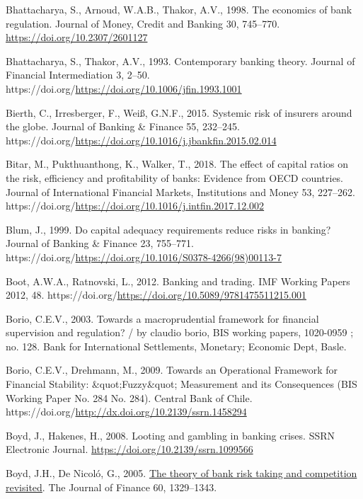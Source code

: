 \documentclass[
  12pt,
  a4paper,
  DIV=11,
  numbers=noendperiod]{scrreprt}
\newlength{\cslhangindent}
\newenvironment{CSLReferences}[2] %
 {\begin{list}{}{%
  \setlength{\itemindent}{0pt}
  \setlength{\leftmargin}{0pt}
  \setlength{\parsep}{0pt}
  \ifodd #1
   \setlength{\leftmargin}{\cslhangindent}
   \setlength{\itemindent}{-1\cslhangindent}
  \fi
  \setlength{\itemsep}{#2\baselineskip}}}
 {\end{list}}
\begin{document}
\begin{CSLReferences}{1}{0}
Bhattacharya, S., Arnoud, W.A.B., Thakor, A.V., 1998. The economics of
bank regulation. Journal of Money, Credit and Banking 30, 745--770.
\url{https://doi.org/10.2307/2601127}

Bhattacharya, S., Thakor, A.V., 1993. Contemporary banking theory.
Journal of Financial Intermediation 3, 2--50.
https://doi.org/\url{https://doi.org/10.1006/jfin.1993.1001}

Bierth, C., Irresberger, F., Weiß, G.N.F., 2015. Systemic risk of
insurers around the globe. Journal of Banking \& Finance 55, 232--245.
https://doi.org/\url{https://doi.org/10.1016/j.jbankfin.2015.02.014}

Bitar, M., Pukthuanthong, K., Walker, T., 2018. The effect of capital
ratios on the risk, efficiency and profitability of banks: Evidence from
OECD countries. Journal of International Financial Markets, Institutions
and Money 53, 227--262.
https://doi.org/\url{https://doi.org/10.1016/j.intfin.2017.12.002}

Blum, J., 1999. Do capital adequacy requirements reduce risks in
banking? Journal of Banking \& Finance 23, 755--771.
https://doi.org/\url{https://doi.org/10.1016/S0378-4266(98)00113-7}

Boot, A.W.A., Ratnovski, L., 2012. Banking and trading. IMF Working
Papers 2012, 48.
https://doi.org/\url{https://doi.org/10.5089/9781475511215.001}

Borio, C.E.V., 2003. Towards a macroprudential framework for financial
supervision and regulation? / by claudio borio, BIS working papers,
1020-0959 ; no. 128. Bank for International Settlements, Monetary;
Economic Dept, Basle.

Borio, C.E.V., Drehmann, M., 2009. {Towards an Operational Framework for
Financial Stability: \&quot;Fuzzy\&quot; Measurement and its
Consequences} (BIS Working Paper No. 284 No. 284). Central Bank of
Chile. https://doi.org/\url{http://dx.doi.org/10.2139/ssrn.1458294}

Boyd, J., Hakenes, H., 2008. Looting and gambling in banking crises.
SSRN Electronic Journal. \url{https://doi.org/10.2139/ssrn.1099566}

Boyd, J.H., De Nicoló, G., 2005.
\href{http://www.jstor.org.queens.ezp1.qub.ac.uk/stable/3694928}{The
theory of bank risk taking and competition revisited}. The Journal of
Finance 60, 1329--1343.


\end{CSLReferences}
\end{document}
